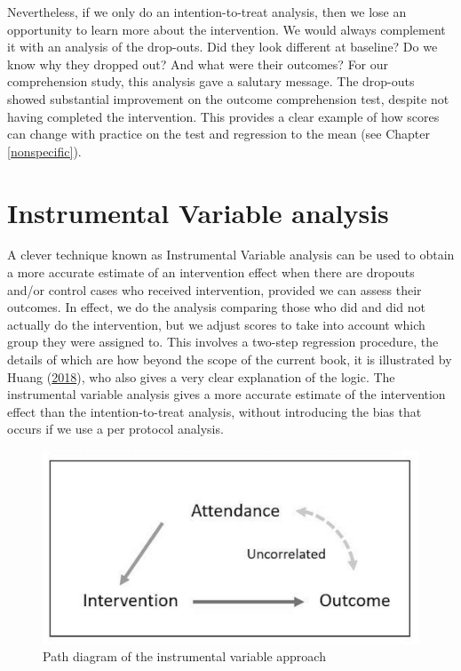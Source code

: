 \documentclass{krantz}
\begin{document}
Nevertheless, if we only do an intention-to-treat analysis, then we lose an opportunity to learn more about the intervention. We would always complement it with an analysis of the drop-outs. Did they look different at baseline? Do we know why they dropped out? And what were their outcomes? For our comprehension study, this analysis gave a salutary message. The drop-outs showed substantial improvement on the outcome comprehension test, despite not having completed the intervention. This provides a clear example of how scores can change with practice on the test and regression to the mean (see Chapter \ref{nonspecific}).

\hypertarget{instrumental-variable-analysis}{%
\section{Instrumental Variable analysis}\label{instrumental-variable-analysis}}

A clever technique known as Instrumental Variable analysis can be used to obtain a more accurate estimate of an intervention effect when there are dropouts and/or control cases who received intervention, provided we can assess their outcomes. In effect, we do the analysis comparing those who did and did not actually do the intervention, but we adjust scores to take into account which group they were assigned to. This involves a two-step regression procedure, the details of which are how beyond the scope of the current book, it is illustrated by Huang (\protect\hyperlink{ref-huang2018}{2018}), who also gives a very clear explanation of the logic. The instrumental variable analysis gives a more accurate estimate of the intervention effect than the intention-to-treat analysis, without introducing the bias that occurs if we use a per protocol analysis.

\begin{center}
\begin{figure}
\includegraphics[width=0.6\linewidth]{images_bw/IV1} \caption{Path diagram of the instrumental variable approach}\label{fig:IVfig}
\end{figure}
\end{center}
\end{document}
